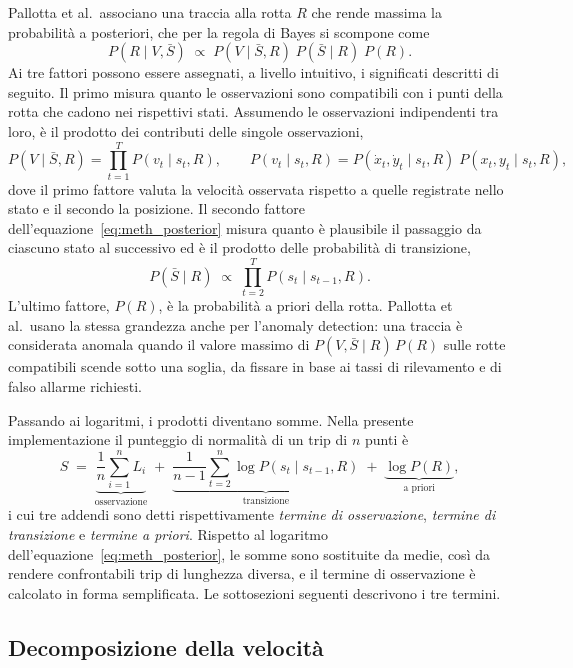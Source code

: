 Pallotta et al.\ associano una traccia alla rotta $R$ che rende massima la probabilità a posteriori,
che per la regola di Bayes si scompone come
\begin{equation}\label{eq:meth_posterior}
    P(R \mid V, \bar{S}) \;\propto\; P(V \mid \bar{S}, R)\; P(\bar{S} \mid R)\; P(R) .
\end{equation}
Ai tre fattori possono essere assegnati, a livello intuitivo, i significati descritti di seguito.
 Il primo misura quanto le osservazioni sono compatibili
con i punti della rotta che cadono nei rispettivi stati. Assumendo le osservazioni indipendenti tra
loro, è il prodotto dei contributi delle singole osservazioni,
\[
    P(V \mid \bar{S}, R) = \prod_{t=1}^{T} P(v_t \mid s_t, R), \qquad
    P(v_t \mid s_t, R) = P(\dot{x}_t, \dot{y}_t \mid s_t, R)\; P(x_t, y_t \mid s_t, R) ,
\]
dove il primo fattore valuta la velocità osservata rispetto a quelle registrate nello stato e il
secondo la posizione. Il secondo fattore dell'equazione~\eqref{eq:meth_posterior} misura quanto è
plausibile il passaggio da ciascuno stato al successivo ed è il prodotto delle probabilità di
transizione,
\[
    P(\bar{S} \mid R) \;\propto\; \prod_{t=2}^{T} P(s_t \mid s_{t-1}, R) .
\]
L'ultimo fattore, $P(R)$, è la probabilità a priori della rotta.
Pallotta et al.\ usano la stessa grandezza anche per l'anomaly detection: una traccia è considerata
anomala quando il valore massimo di $P(V, \bar{S} \mid R)\,P(R)$ sulle rotte compatibili scende sotto
una soglia, da fissare in base ai tassi di rilevamento e di falso allarme richiesti.

Passando ai logaritmi, i prodotti diventano somme. Nella presente implementazione il punteggio di
normalità di un trip di $n$ punti è
\begin{equation}\label{eq:meth_score}
    S \;=\; \underbrace{\frac{1}{n} \sum_{i=1}^{n} L_i}_{\text{osservazione}}
    \;+\; \underbrace{\frac{1}{n-1} \sum_{t=2}^{n} \log P(s_t \mid s_{t-1}, R)}_{\text{transizione}}
    \;+\; \underbrace{\log P(R)}_{\text{a priori}} ,
\end{equation}
i cui tre addendi sono detti rispettivamente \emph{termine di osservazione}, \emph{termine di
transizione} e \emph{termine a priori}. Rispetto al logaritmo dell'equazione~\eqref{eq:meth_posterior},
le somme sono sostituite da medie, così da rendere confrontabili trip di lunghezza diversa, e il termine
di osservazione è calcolato in forma semplificata. Le sottosezioni seguenti descrivono i tre termini.

\subsection{Decomposizione della velocità}

